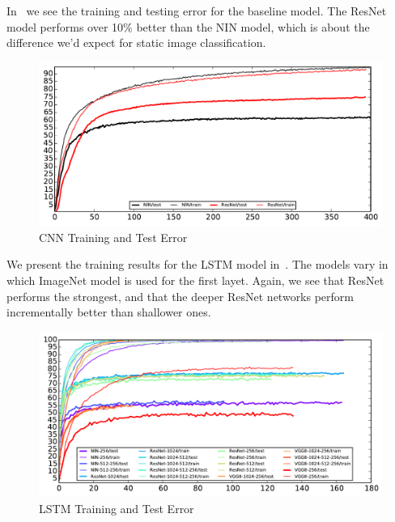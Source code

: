 In~ we see the training and testing error for the baseline model. The ResNet model performs over 10\% better than the NIN model, which is about the difference we'd expect for static image classification. 
\begin{figure}
  \centering
  \includegraphics[width=1.0\linewidth]{figs/CNNout}
  \caption{CNN Training and Test Error}
  \label{fig:cnntest}
\end{figure}

We present the training results for the LSTM model in~. The models vary in which ImageNet model is used for the first layet. Again, we see that ResNet performs the strongest, and that the deeper ResNet networks perform incrementally better than shallower ones. 
\begin{figure}
  \centering
  \includegraphics[width=1.0\linewidth]{figs/RNNout}
  \caption{LSTM Training and Test Error}
  \label{fig:lstmtest}
\end{figure}

